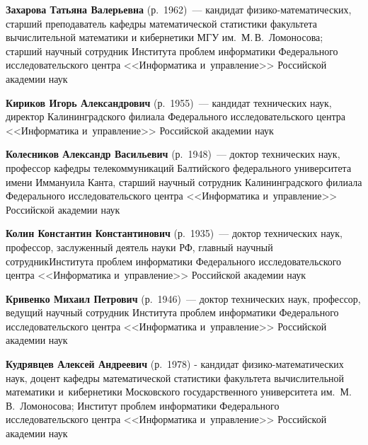\begin{multicols}{2}
\vspace*{3pt}

\noindent
\textbf{Захарова Татьяна Валерьевна} (р.\ 1962)~--- кандидат 
фи\-зи\-ко-ма\-те\-ма\-ти\-че\-ских, старший преподаватель кафедры 
математической статистики факультета вычислительной математики и кибернетики МГУ 
им.\ М.\,В.~Ломоносова; старший научный сотрудник Института проб\-лем 
информатики Федерального исследовательского центра <<Информатика и~управ\-ле\-ние>> 
Российской академии наук

\vspace*{3pt}

\noindent
\textbf{Кириков Игорь Александрович} (р.\ 1955)~---
кандидат технических наук, 
директор Калининградского филиала Федерального исследовательского центра 
<<Информатика и~управление>> Российской академии наук

\vspace*{3pt}


\noindent
\textbf{Колесников Александр Васильевич} (р.\ 1948)~--- доктор технических наук, 
профессор кафедры телекоммуникаций 
Балтийского федерального университета 
имени Иммануила Канта, старший научный сотрудник 
Калининградского филиала Федерального исследовательского центра 
<<Информатика и~управ\-ле\-ние>> Российской академии наук

\vspace*{3pt}

\noindent
\textbf{Колин Константин Константинович} (р.\ 1935)~---
доктор технических наук, профессор, заслуженный деятель науки РФ, 
главный научный сотрудник\linebreak Института проб\-лем информатики Федерального 
исследовательского центра <<Информатика и~управ\-ле\-ние>> Российской академии наук 

\vspace*{3pt}

\noindent
\textbf{Кривенко Михаил Петрович} (р.\ 1946)~---
доктор технических наук, профессор, ведущий научный сотруд\-ник Института 
проб\-лем информатики Федерального исследовательского центра 
<<Информатика и~управ\-ле\-ние>> Российской академии наук

\vspace*{3pt}

\noindent
\textbf{Кудрявцев Алексей Андреевич} (р.\ 1978) - кандидат 
фи\-зи\-ко-ма\-те\-ма\-ти\-че\-ских наук, доцент кафедры математической 
статистики факультета вычислительной математики и~кибернетики Московского 
государственного университета им.\ М.\,В.~Ломоносова; Институт проб\-лем 
информатики Федерального исследовательского центра <<Информатика и~управ\-ле\-ние>> 
Российской академии наук


\end{multicols}

